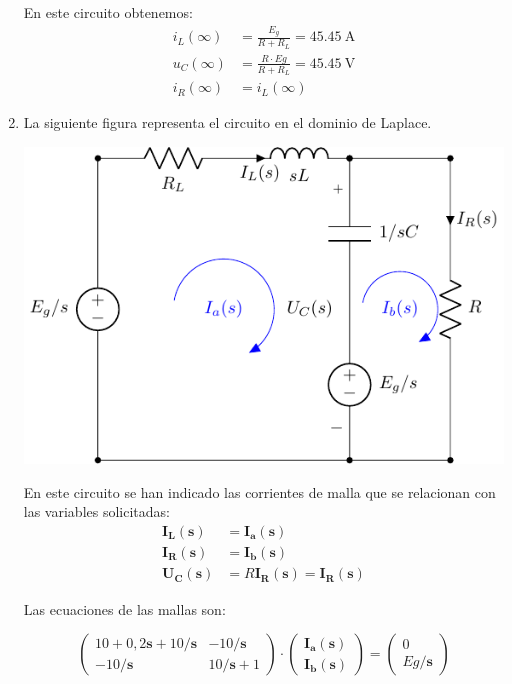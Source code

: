 \documentclass[12pt]{article}
\newcommand{\laplace}[1]{\mathbf{#1}(\mathbf{s})}
\newcommand{\slp}{\mathbf{s}}
\begin{document}
\begin{enumerate}
  En este circuito obtenemos:
  \begin{align*}
    i_L(\infty) &= \frac{E_g}{R + R_L} = \SI{45.45}{\ampere}\\
    u_C(\infty) &= \frac{R \cdot Eg}{R + R_L} = \SI{45.45}{\volt}\\
    i_R(\infty) &= i_L(\infty)
  \end{align*}

\item

  La siguiente figura representa el circuito en el dominio de Laplace.

  \includegraphics{figs/E2_laplace.pdf}

  En este circuito se han indicado las corrientes de malla que se relacionan con las variables solicitadas:
  \begin{align*}
    \laplace{I_L} &= \laplace{I_a}\\
    \laplace{I_R} &= \laplace{I_b}\\
    \laplace{U_C} &= R \laplace{I_R} = \laplace{I_R}
  \end{align*}
  
  Las ecuaciones de las mallas son:

  \[
    \left(
    \begin{array}{cc}
      10 + 0,2\slp + 10/\slp & -10/\slp\\
      -10/\slp & 10/\slp + 1
    \end{array}
  \right)
  \cdot
  \left(
    \begin{array}{c}
      \laplace{I_a}\\
      \laplace{I_b}
    \end{array}
  \right)
  =
  \left(
    \begin{array}{c}
      0\\
      Eg/\slp
    \end{array}
  \right)
  \]


\end{enumerate}
\end{document}

